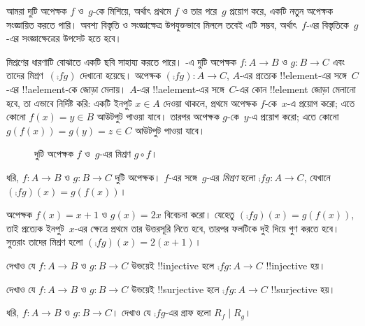 \documentclass[../../../include/open-logic-section]{subfiles}
\begin{document}

\begin{explain}
আমরা দুটি অপেক্ষক $f$ ও~$g$-কে মিশিয়ে, অর্থাৎ প্রথমে $f$ ও তার পরে~$g$ প্রয়োগ করে, একটি নতুন অপেক্ষক সংজ্ঞায়িত করতে পারি। অবশ্য বিস্তৃতি ও সংজ্ঞাক্ষেত্র উপযুক্তভাবে মিললে তবেই এটি সম্ভব, অর্থাৎ~$f$-এর বিস্তৃতিকে~$g$-এর সংজ্ঞাক্ষেত্রের উপসেট হতে হবে। 

মিশ্রণের ধারণাটি বোঝাতে একটি ছবি সাহায্য করতে পারে। -এ দুটি অপেক্ষক $f \colon A \to B$ ও $g \colon B \to C$ এবং তাদের মিশ্রণ~$(\comp{f}{g})$ দেখানো হয়েছে। অপেক্ষক $(\comp{f}{g}) \colon A \to C$, $A$-এর প্রত্যেক !!{element}-এর সঙ্গে~$C$-এর !!a{element}-কে জোড়া মেলায়। $A$-এর !!a{element}-এর সঙ্গে~$C$-এর কোন !!{element} জোড়া মেলানো হবে, তা এভাবে নির্দিষ্ট করি: একটি ইনপুট $x \in
A$ দেওয়া থাকলে, প্রথমে অপেক্ষক $f$-কে~$x$-এ প্রয়োগ করো; এতে কোনো $f(x)
= y \in B$ আউটপুট পাওয়া যাবে। তারপর অপেক্ষক $g$-কে~$y$-এ প্রয়োগ করো; এতে কোনো $g(f(x)) = g(y) = z \in C$ আউটপুট পাওয়া যাবে।
\begin{figure}
  \caption{দুটি অপেক্ষক $f$ ও~$g$-এর মিশ্রণ $g \circ f$।}
\end{figure}
\end{explain}

\begin{defn}[মিশ্রণ]
ধরি, $f\colon A \to B$ ও $g\colon B \to C$ দুটি অপেক্ষক। $f$-এর সঙ্গে~$g$-এর \emph{মিশ্রণ} হলো $\comp{f}{g} \colon A \to C$, যেখানে $(\comp{f}{g})(x) = g(f(x))$।
\end{defn}

\begin{ex}
অপেক্ষক $f(x) = x + 1$ ও $g(x) = 2x$ বিবেচনা করো। যেহেতু $(\comp{f}{g})(x) = g(f(x))$, তাই প্রত্যেক ইনপুট~$x$-এর ক্ষেত্রে প্রথমে তার উত্তরসূরি নিতে হবে, তারপর ফলটিকে দুই দিয়ে গুণ করতে হবে। সুতরাং তাদের মিশ্রণ হলো $(\comp{f}{g})(x) = 2(x+1)$।
\end{ex}

\begin{prob}
দেখাও যে $f \colon A \to B$ ও $g \colon B \to C$ উভয়েই !!{injective} হলে $\comp{f}{g}\colon A \to C$ !!{injective} হয়।
\end{prob}

\begin{prob}
দেখাও যে $f \colon A \to B$ ও $g \colon B \to C$ উভয়েই !!{surjective} হলে $\comp{f}{g}\colon A \to C$ !!{surjective} হয়।
\end{prob}

\begin{prob}
ধরি, $f \colon A \to B$ ও $g \colon B \to C$। দেখাও যে $\comp{f}{g}$-এর গ্রাফ হলো $R_f \mid R_g$।
\end{prob}
\end{document}
